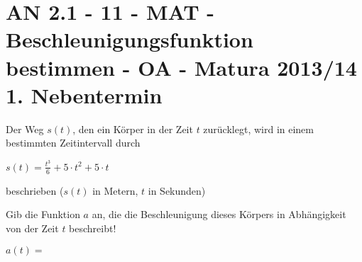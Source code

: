 \section{AN 2.1 - 11 - MAT - Beschleunigungsfunktion bestimmen - OA - Matura 2013/14 1. Nebentermin}

\begin{beispiel}[AN 2.1]{1} %
				Der Weg $s(t)$, den ein Körper in der Zeit $t$ zurücklegt, wird in einem bestimmten Zeitintervall durch
				\begin{center}$s(t)=\frac{t^3}{6}+5\cdot t^2+5\cdot t$\end{center}
				beschrieben ($s(t)$ in Metern, $t$ in Sekunden)
				
				Gib die Funktion $a$ an, die die Beschleunigung dieses Körpers in Abhängigkeit von der Zeit $t$ beschreibt!\leer
				
				$a(t)=$ 
\end{beispiel}